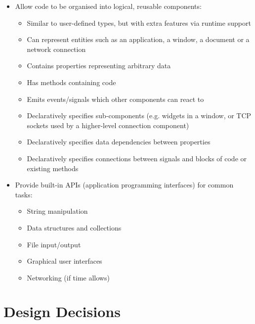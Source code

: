 \documentclass[11pt]{report}
\begin{document}
\begin{itemize}
    \item Allow code to be organised into logical, reusable components:

    \begin{itemize}
        \item Similar to user-defined types, but with extra features via runtime support

        \item Can represent entities such as an application, a window, a document or a network connection

        \item Contains properties representing arbitrary data

        \item Has methods containing code

        \item Emits events/signals which other components can react to

        \item Declaratively specifies sub-components (e.g. widgets in a window, or TCP sockets used by a higher-level connection component)

        \item Declaratively specifies data dependencies between properties

        \item Declaratively specifies connections between signals and blocks of code or existing methods
    \end{itemize}

    \item Provide built-in APIs (application programming interfaces) for common tasks:
    
    \begin{itemize}
        \item String manipulation
        
        \item Data structures and collections
        
        \item File input/output
        
        \item Graphical user interfaces
        
        \item Networking (if time allows)
    \end{itemize}
\end{itemize}

\section{Design Decisions}
\end{document}
